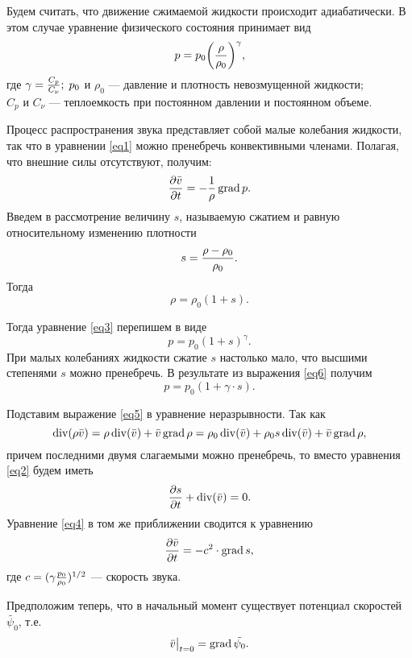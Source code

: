 Будем считать, что движение сжимаемой жидкости происходит адиабатически. В этом случае уравнение физического состояния принимает вид
\begin{equation}\label{eq3}
p=p_0\bigg(\frac{\rho}{\rho_0}\bigg)^\gamma,
\end{equation}
где $\gamma=\frac{C_p}{C_{\nu}}; \; p_0$ и $\rho_0$ --- давление и плотность невозмущенной жидкости; \\ $C_p$ и $C_{\nu}$ --- теплоемкость при постоянном давлении и постоянном объеме.

Процесс распространения звука представляет собой малые колебания жидкости, так что в уравнении \eqref{eq1} можно пренебречь конвективными членами. Полагая, что внешние силы отсутствуют, получим:
\begin{equation}\label{eq4}
\frac{\partial \bar{v}}{\partial t} = - \frac{1}{\rho}\operatorname{grad} p.
\end{equation}
Введем в рассмотрение величину $s$, называемую сжатием и равную относительному изменению плотности
$$
s=\frac{\rho - \rho_0}{\rho_0}.
$$
Тогда
\begin{equation}\label{eq5}
\rho = \rho_0 (1+s).
\end{equation}

Тогда уравнение \eqref{eq3} перепишем в виде
\begin{equation}\label{eq6}
p=p_0(1+s)^\gamma.
\end{equation}
При малых колебаниях жидкости сжатие $s$ настолько мало, что высшими степенями  $s$ можно пренебречь. В результате из выражения \eqref{eq6} получим
\begin{equation}\label{eq7}
p=p_0(1+\gamma \cdot s).
\end{equation}

Подставим выражение \eqref{eq5} в уравнение неразрывности. Так как 
$$
\operatorname{div}(\rho \bar{v})= \rho\operatorname{div}(\bar{v})+\bar{v} \operatorname{grad} \rho = \rho_0 \operatorname{div}(\bar{v}) + \rho_0 s \operatorname{div}(\bar{v}) + \bar{v} \operatorname{grad} \rho,
$$
причем последними двумя слагаемыми можно пренебречь, то вместо уравнения \eqref{eq2} будем иметь
\begin{equation}\label{eq8}
\frac{\partial s}{\partial t} + \operatorname{div} (\bar{v}) = 0.
\end{equation}
Уравнение \eqref{eq4} в том же приближении сводится к уравнению
\begin{equation}\label{eq9}
\frac{\partial \bar{v}}{\partial t} = -c^2\cdot\operatorname{grad} s,
\end{equation}
где $c=(\gamma \frac{p_0}{\rho_0})^{1/2}$ --- скорость звука.

Предположим теперь, что в начальный момент существует потенциал скоростей $\tilde{\psi_0}$, т.е.
\begin{equation}\label{eq 10}
\bar{v}\big|_{t=0}=\operatorname{grad}\tilde{\psi_0}.
\end{equation}

